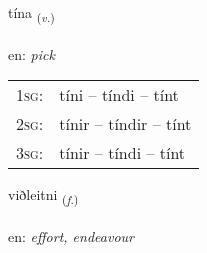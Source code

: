 \documentclass[frontgrid, backgrid]{flacards}\usepackage[]{graphicx}\usepackage[]{xcolor}
\begin{document}
\renewcommand{\flhead}{\vskip5pt \fboxsep=0pt {\small\bfseries\footnotesize Sagnorð | Verb}}
\renewcommand{\fcfoot}{\vskip5pt \fboxsep=0pt \hspace{2pt}{\small\bfseries\footnotesize 3K}}

\renewcommand{\blhead}{\vskip5pt {\small\bfseries\footnotesize Sagnorð | Verb }}
\renewcommand{\bcfoot}{\vskip5pt \hspace{2pt}{\small\bfseries\footnotesize 3K}}


{tína \small{\textsubscript{(\textit{v.})}} \\[1ex] %
\textphonetic{[tʰiːna]} \\
en: \emph{pick} \\  [2ex]
\renewcommand*{\arraystretch}{0.8}
\begin{tabular}{p{1cm}l}
\textsc{1sg}: & tíni -- tíndi -- tínt \\ 
\textsc{2sg}: & tínir -- tíndir -- tínt \\ 
\textsc{3sg}: & tínir -- tíndi -- tínt \\ 
\end{tabular}
}

\renewcommand{\flhead}{\vskip5pt \fboxsep=0pt {\small\bfseries\footnotesize Nafnorð | Noun}}
\renewcommand{\fcfoot}{\vskip5pt \fboxsep=0pt \hspace{2pt}{\small\bfseries\footnotesize 3K}}

\renewcommand{\blhead}{\vskip5pt {\small\bfseries\footnotesize Nafnorð | Noun }}
\renewcommand{\bcfoot}{\vskip5pt \hspace{2pt}{\small\bfseries\footnotesize 3K}}


{viðleitni \small{\textsubscript{(\textit{f.})}} \\[1ex] %
\textphonetic{[vɪðleihtnɪ]} \\
en: \emph{effort, endeavour} \\  [2ex]
\renewcommand*{\arraystretch}{0.8}
}
\end{document}
